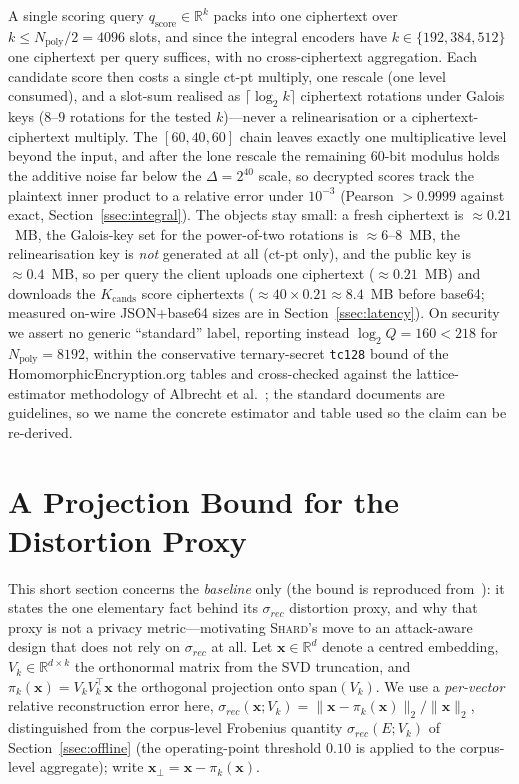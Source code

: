 \documentclass[11pt,a4paper]{article}
\begin{document}
A single scoring query $q_{\mathrm{score}} \in \mathbb{R}^{k}$ packs into one ciphertext over
$k \leq N_{\mathrm{poly}}/2 = 4096$ slots, and since the integral encoders have
$k \in \{192,384,512\}$ one ciphertext per query suffices, with no
cross-ciphertext aggregation. Each candidate score then costs a single ct-pt
multiply, one rescale (one level consumed), and a slot-sum realised as
$\lceil \log_2 k \rceil$ ciphertext rotations under Galois keys ($8$--$9$
rotations for the tested $k$)---never a relinearisation or a
ciphertext-ciphertext multiply. The $[60,40,60]$ chain leaves exactly one
multiplicative level beyond the input, and after the lone rescale the
remaining $60$-bit modulus holds the additive noise far below the
$\Delta = 2^{40}$ scale, so decrypted scores track the plaintext inner product
to a relative error under $10^{-3}$ (Pearson $>0.9999$ against exact,
Section~\ref{ssec:integral}). The objects stay small: a fresh ciphertext is
$\approx 0.21$~MB, the Galois-key set for the power-of-two rotations is
$\approx 6$--$8$~MB, the relinearisation key is \emph{not} generated at all
(ct-pt only), and the public key is $\approx 0.4$~MB, so per query the client
uploads one ciphertext ($\approx 0.21$~MB) and downloads the
$K_{\mathrm{cands}}$ score ciphertexts ($\approx 40 \times 0.21 \approx 8.4$~MB
before base64; measured on-wire JSON+base64 sizes are in
Section~\ref{ssec:latency}). On security we assert no generic ``standard''
label, reporting instead $\log_2 Q = 160 < 218$ for $N_{\mathrm{poly}}=8192$,
within the conservative ternary-secret \texttt{tc128} bound of the
HomomorphicEncryption.org tables \cite{ref_he_std} and cross-checked against
the lattice-estimator methodology of Albrecht et al.\
\cite{ref_lwe_estimator}; the standard documents are guidelines, so we name the
concrete estimator and table used so the claim can be re-derived.

\section{A Projection Bound for the Distortion Proxy}\label{sec:lemma}

This short section concerns the \emph{baseline} only (the bound is
reproduced from~\cite{ref_alpha}): it states the one elementary fact behind
its $\sigma_{rec}$ distortion proxy, and why that proxy is not a privacy
metric---motivating \textsc{Shard}'s move to an
attack-aware design that does not rely on $\sigma_{rec}$ at all. Let
$\mathbf{x} \in \mathbb{R}^d$ denote a centred embedding,
$V_k \in \mathbb{R}^{d \times k}$ the orthonormal matrix from the SVD
truncation, and $\pi_k(\mathbf{x}) = V_k V_k^\top \mathbf{x}$ the
orthogonal projection onto $\mathrm{span}(V_k)$. We use a \emph{per-vector}
relative reconstruction error here,
$\sigma_{rec}(\mathbf{x}; V_k) =
\| \mathbf{x} - \pi_k(\mathbf{x}) \|_2 / \|\mathbf{x}\|_2$,
distinguished from the corpus-level Frobenius quantity
$\sigma_{rec}(E;V_k)$ of Section~\ref{ssec:offline} (the operating-point
threshold $0.10$ is applied to the corpus-level aggregate); write
$\mathbf{x}_\perp = \mathbf{x} - \pi_k(\mathbf{x})$.
\end{document}
